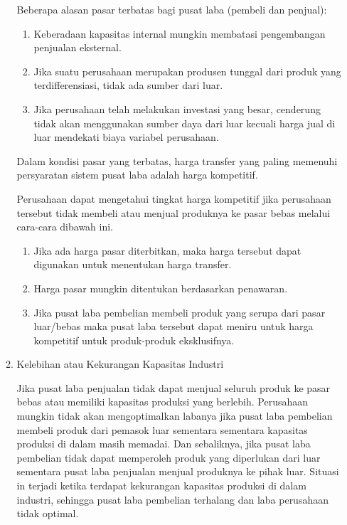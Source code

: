 \begin{spacing}{1.5}
\begin{enumerate}
\begin{enumerate}
		Beberapa alasan pasar terbatas bagi pusat laba (pembeli dan penjual):

		\begin{enumerate}
			\item Keberadaan kapasitas internal mungkin membatasi pengembangan penjualan eksternal.
			\item Jika suatu perusahaan merupakan produsen tunggal dari produk yang terdifferensiasi, tidak ada sumber dari luar.
			\item Jika perusahaan telah melakukan investasi yang besar, cenderung tidak akan menggunakan sumber daya dari luar kecuali harga jual di luar mendekati biaya variabel perusahaan.
		\end{enumerate}

		Dalam kondisi pasar yang terbatas, harga transfer yang paling memenuhi persyaratan sistem pusat laba adalah harga kompetitif.

		Perusahaan dapat mengetahui tingkat harga kompetitif jika perusahaan tersebut tidak membeli atau menjual produknya ke pasar bebas melalui cara-cara dibawah ini.

		\begin{enumerate}
			\item Jika ada harga pasar diterbitkan, maka harga tersebut dapat digunakan untuk menentukan harga transfer.
			\item Harga pasar mungkin ditentukan berdasarkan penawaran.
			\item Jika pusat laba pembelian membeli produk yang serupa dari pasar luar/bebas maka pusat laba tersebut dapat meniru untuk harga kompetitif untuk produk-produk eksklusifnya.
		\end{enumerate}

		\item Kelebihan atau Kekurangan Kapasitas Industri
		
		Jika pusat laba penjualan tidak dapat menjual seluruh produk ke pasar bebas atau memiliki kapasitas produksi yang berlebih. Perusahaan mungkin tidak akan mengoptimalkan labanya jika pusat laba pembelian membeli produk dari pemasok luar sementara sementara kapasitas produksi di dalam masih memadai. Dan sebaliknya, jika pusat laba pembelian tidak dapat memperoleh produk yang diperlukan dari luar sementara pusat laba penjualan menjual produknya ke pihak luar. Situasi in terjadi ketika terdapat kekurangan kapasitas produksi di dalam industri, sehingga pusat laba pembelian terhalang dan laba perusahaan tidak optimal.
	\end{enumerate}


\end{enumerate}
\end{spacing}
